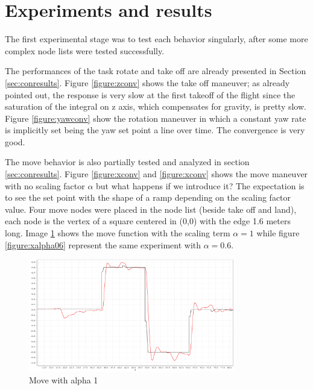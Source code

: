 \section{Experiments and results}

The first experimental stage was to test each behavior singularly, after some more complex node lists were tested successfully. 

The performances of the task rotate and take off are already presented in Section \ref{sec:conresults}. Figure \ref{figure:zconv} shows the take off maneuver; as already pointed out, the response is very slow at the first takeoff of the flight since the saturation of the integral on z axis, which compensates for gravity, is pretty slow. Figure \ref{figure:yawconv} show the rotation maneuver in which a constant yaw rate is implicitly set being the yaw set point a line over time. The convergence is very good. 

The move behavior is also partially tested and analyzed in section \ref{sec:conresults}. Figure \ref{figure:xconv} and \ref{figure:xconv} shows the move maneuver with no scaling factor $\alpha$ but what happens if we introduce it? The expectation is to see the set point with the shape of a ramp depending on the scaling factor value. Four move nodes were placed in the node list (beside take off and land), each node is the vertex of a square centered in (0,0) with the edge 1.6 meters long. Image \ref{figure:xalpha1} shows the move function with the scaling term $\alpha = 1$ while figure \ref{figure:xalpha06} represent the same experiment with $\alpha = 0.6$. 
\begin{figure}[h]
\centering
 \includegraphics[width=0.8\textwidth]{xalpha1.png}
 \caption{Move with alpha 1}
 \label{figure:xalpha1}
\end{figure}

